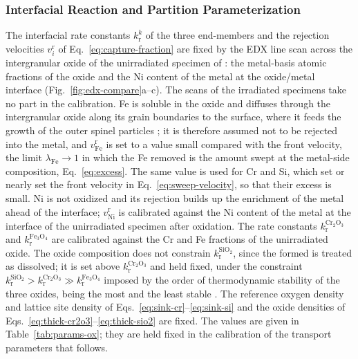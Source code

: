 \documentclass[3p,times]{elsarticle} %
\newcommand{\textcite}[1]{\citet{#1}}
\begin{document}
\subsubsection{Interfacial Reaction and Partition Parameterization}
\label{sec:methodGBOXidationCalibration}
The interfacial rate constants \(k_{\mathrm{r}}^{k}\) of the three end-members
and the rejection velocities \(v_i^{\mathrm{r}}\) of
Eq.~\eqref{eq:capture-fraction} are fixed by the EDX line scan across the
intergranular oxide of the unirradiated specimen of \textcite{deng2017effect}:
the metal-basis atomic fractions of the oxide and the Ni content of the metal
at the oxide/metal interface (Fig.~\ref{fig:edx-compare}a--c). The scans of the irradiated specimens take no part in the
calibration. Fe is soluble in the oxide and
diffuses through the intergranular oxide along its grain boundaries to the
surface, where it feeds the growth of the outer spinel particles
\cite{deng2020corrosion}; it is therefore assumed not to be rejected
into the metal, and \(v_{\mathrm{Fe}}^{\mathrm{r}}\) is set to a value small
compared with the front velocity, the limit \(\lambda_{\mathrm{Fe}}\to1\) in
which the Fe removed is the amount swept at the metal-side composition,
Eq.~\eqref{eq:excess}. The same value is used for Cr and Si, which set or
nearly set the front velocity in Eq.~\eqref{eq:sweep-velocity}, so that their
excess is small. Ni is not oxidized and its rejection builds up the enrichment
of the metal ahead of the interface; \(v_{\mathrm{Ni}}^{\mathrm{r}}\) is
calibrated against the Ni content of the metal at the interface of the
unirradiated specimen after oxidation. The rate
constants \(k_{\mathrm{r}}^{\mathrm{Cr_2O_3}}\) and
\(k_{\mathrm{r}}^{\mathrm{Fe_3O_4}}\) are calibrated against the Cr and Fe
fractions of the unirradiated oxide. The oxide composition does not constrain
\(k_{\mathrm{r}}^{\mathrm{SiO_2}}\), since the  formed is treated as
dissolved; it is set above \(k_{\mathrm{r}}^{\mathrm{Cr_2O_3}}\) and held
fixed, under the constraint
\(k_{\mathrm{r}}^{\mathrm{SiO_2}}>k_{\mathrm{r}}^{\mathrm{Cr_2O_3}}
\gg k_{\mathrm{r}}^{\mathrm{Fe_3O_4}}\) imposed by the order of
thermodynamic stability of the three oxides,  being the most and
 the least stable \cite{young2016high}. The reference oxygen
density and lattice site density of Eqs.~\eqref{eq:sink-cr}--\eqref{eq:sink-si}
and the oxide densities of Eqs.~\eqref{eq:thick-cr2o3}--\eqref{eq:thick-sio2}
are fixed. The values are given in Table~\ref{tab:params-ox}; they are held
fixed in the calibration of the transport parameters that follows.
\end{document}
